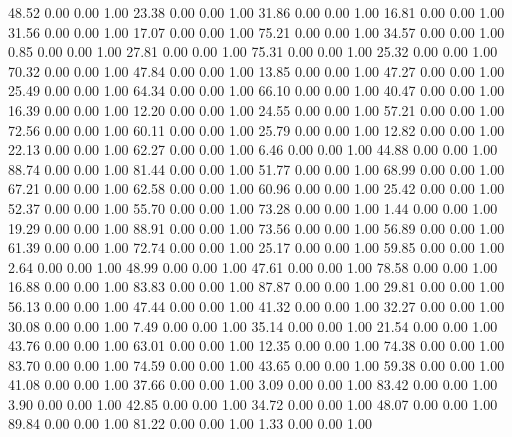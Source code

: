    48.52   0.00   0.00   1.00
   23.38   0.00   0.00   1.00
   31.86   0.00   0.00   1.00
   16.81   0.00   0.00   1.00
   31.56   0.00   0.00   1.00
   17.07   0.00   0.00   1.00
   75.21   0.00   0.00   1.00
   34.57   0.00   0.00   1.00
    0.85   0.00   0.00   1.00
   27.81   0.00   0.00   1.00
   75.31   0.00   0.00   1.00
   25.32   0.00   0.00   1.00
   70.32   0.00   0.00   1.00
   47.84   0.00   0.00   1.00
   13.85   0.00   0.00   1.00
   47.27   0.00   0.00   1.00
   25.49   0.00   0.00   1.00
   64.34   0.00   0.00   1.00
   66.10   0.00   0.00   1.00
   40.47   0.00   0.00   1.00
   16.39   0.00   0.00   1.00
   12.20   0.00   0.00   1.00
   24.55   0.00   0.00   1.00
   57.21   0.00   0.00   1.00
   72.56   0.00   0.00   1.00
   60.11   0.00   0.00   1.00
   25.79   0.00   0.00   1.00
   12.82   0.00   0.00   1.00
   22.13   0.00   0.00   1.00
   62.27   0.00   0.00   1.00
    6.46   0.00   0.00   1.00
   44.88   0.00   0.00   1.00
   88.74   0.00   0.00   1.00
   81.44   0.00   0.00   1.00
   51.77   0.00   0.00   1.00
   68.99   0.00   0.00   1.00
   67.21   0.00   0.00   1.00
   62.58   0.00   0.00   1.00
   60.96   0.00   0.00   1.00
   25.42   0.00   0.00   1.00
   52.37   0.00   0.00   1.00
   55.70   0.00   0.00   1.00
   73.28   0.00   0.00   1.00
    1.44   0.00   0.00   1.00
   19.29   0.00   0.00   1.00
   88.91   0.00   0.00   1.00
   73.56   0.00   0.00   1.00
   56.89   0.00   0.00   1.00
   61.39   0.00   0.00   1.00
   72.74   0.00   0.00   1.00
   25.17   0.00   0.00   1.00
   59.85   0.00   0.00   1.00
    2.64   0.00   0.00   1.00
   48.99   0.00   0.00   1.00
   47.61   0.00   0.00   1.00
   78.58   0.00   0.00   1.00
   16.88   0.00   0.00   1.00
   83.83   0.00   0.00   1.00
   87.87   0.00   0.00   1.00
   29.81   0.00   0.00   1.00
   56.13   0.00   0.00   1.00
   47.44   0.00   0.00   1.00
   41.32   0.00   0.00   1.00
   32.27   0.00   0.00   1.00
   30.08   0.00   0.00   1.00
    7.49   0.00   0.00   1.00
   35.14   0.00   0.00   1.00
   21.54   0.00   0.00   1.00
   43.76   0.00   0.00   1.00
   63.01   0.00   0.00   1.00
   12.35   0.00   0.00   1.00
   74.38   0.00   0.00   1.00
   83.70   0.00   0.00   1.00
   74.59   0.00   0.00   1.00
   43.65   0.00   0.00   1.00
   59.38   0.00   0.00   1.00
   41.08   0.00   0.00   1.00
   37.66   0.00   0.00   1.00
    3.09   0.00   0.00   1.00
   83.42   0.00   0.00   1.00
    3.90   0.00   0.00   1.00
   42.85   0.00   0.00   1.00
   34.72   0.00   0.00   1.00
   48.07   0.00   0.00   1.00
   89.84   0.00   0.00   1.00
   81.22   0.00   0.00   1.00
    1.33   0.00   0.00   1.00
